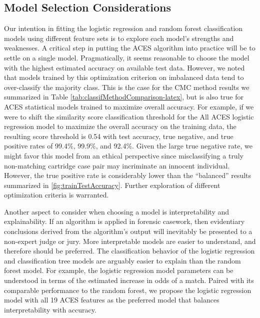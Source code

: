 \documentclass[11pt,]{isuthesis}
\begin{document}
\hypertarget{model-selection-considerations}{%
\subsection{Model Selection Considerations}\label{model-selection-considerations}}

Our intention in fitting the logistic regression and random forest classification models using different feature sets is to explore each model's strengths and weaknesses.
A critical step in putting the ACES algorithm into practice will be to settle on a single model.
Pragmatically, it seems reasonable to choose the model with the highest estimated accuracy on available test data.
However, we noted that models trained by this optimization criterion on imbalanced data tend to over-classify the majority class.
This is the case for the CMC method results we summarized in Table \ref{tab:classifMethodComparison-latex}, but is also true for ACES statistical models trained to maximize overall accuracy.
For example, if we were to shift the similarity score classification threshold for the All ACES logistic regression model to maximize the overall accuracy on the training data, the resulting score threshold is 0.54 with test accuracy, true negative, and true positive rates of 99.4\%, 99.9\%, and 92.4\%.
Given the large true negative rate, we might favor this model from an ethical perspective since misclassifying a truly non-matching cartridge case pair may incriminate an innocent individual.
However, the true positive rate is considerably lower than the ``balanced'' results summarized in \ref{fig:trainTestAccuracy}.
Further exploration of different optimization criteria is warranted.

Another aspect to consider when choosing a model is interpretability and explainability.
If an algorithm is applied in forensic casework, then evidentiary conclusions derived from the algorithm's output will inevitably be presented to a non-expert judge or jury.
More interpretable models are easier to understand, and therefore should be preferred.
The classification behavior of the logistic regression and classification tree models are arguably easier to explain than the random forest model.
For example, the logistic regression model parameters can be understood in terms of the estimated increase in odds of a match.
Paired with its comparable performance to the random forest, we propose the logistic regression model with all 19 ACES features as the preferred model that balances interpretability with accuracy.
\end{document}
